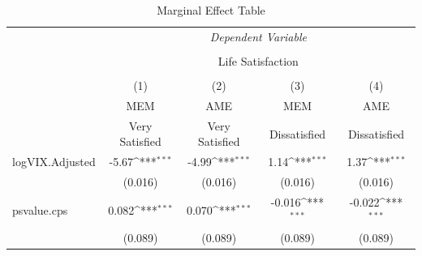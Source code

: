 \documentclass[11pt,a4paper,oldfontcommands]{memoir}
\begin{document}
{\begin{footnotesize}
\def\sym#1{\ifmmode^{#1}\else\(^{#1}\)\fi}
\begin{longtable}{l*{4}{c}}
\caption{Marginal Effect Table \label{tab:marginal1}} \\
\hline\hline
& \multicolumn{4}{c}{ \textit{Dependent Variable}} \\
\cline{2-5}\\[-4ex]
& \multicolumn{4}{c}{Life Satisfaction}\\
\\[-4ex]
                    &\multicolumn{1}{c}{(1)}&\multicolumn{1}{c}{(2)}&\multicolumn{1}{c}{(3)}&\multicolumn{1}{c}{(4)}\\
                    &\multicolumn{1}{c}{MEM}&\multicolumn{1}{c}{AME}&\multicolumn{1}{c}{MEM}&\multicolumn{1}{c}{AME}\\
                    &\multicolumn{1}{c}{Very Satisfied}&\multicolumn{1}{c}{Very Satisfied}&\multicolumn{1}{c}{Dissatisfied}&\multicolumn{1}{c}{Dissatisfied}\\
\hline
logVIX.Adjusted     &       -5.67\sym{***}&       -4.99\sym{***}&       1.14\sym{***}&      1.37\sym{***}\\
                    &     (0.016)         &     (0.016)         &     (0.016)         &     (0.016)         \\
 
psvalue.cps         &       0.082\sym{***}&       0.070\sym{***}&       -0.016\sym{***}&       -0.022\sym{***}\\
                    &     (0.089)         &     (0.089)         &     (0.089)         &     (0.089)         \\


\end{longtable}
\end{footnotesize}}
\end{document}
